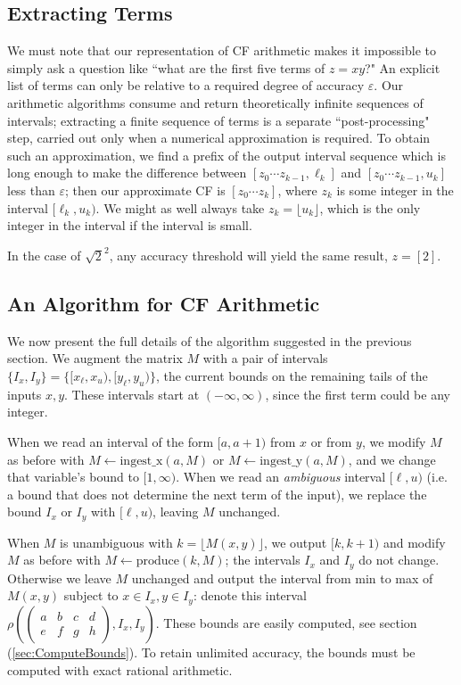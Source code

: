 \documentclass[11pt, oneside]{amsart}   	%
\newcommand{\abcd}{\left(
\begin{smallmatrix} 
a & b & c & d\\ 
e & f & g & h
\end{smallmatrix}
\right)}
\renewcommand{\:}{\negthickspace:\negthickspace}
\begin{document}
\subsection{Extracting Terms}
We must note that our representation of CF arithmetic makes it impossible to simply ask a question like ``what are the first
five terms of $z = xy$?" An explicit list of terms can only be relative to a required degree of accuracy $\varepsilon$. Our arithmetic
algorithms consume and return theoretically infinite sequences of intervals; extracting a finite sequence of terms is a separate
``post-processing" step, carried out only when a numerical approximation is required.
To obtain such an approximation, we find a prefix of
the output interval sequence which is long enough to make the difference between $[z_0 \cdots z_{k-1}, \ell_k]$ and $[z_0 \cdots
z_{k-1}, u_k]$ less than $\varepsilon$; then our approximate CF is $[z_0 \cdots z_k]$, where $z_k$ is some integer in the interval
$[\ell_k,u_k)$. We might as well always take $z_k = \lfloor u_k \rfloor$, which is the only integer in the interval if the interval is small. 

In the case of $\sqrt{2}^2$, any accuracy threshold will yield the same result, $z = [2]$.


\subsection{An Algorithm for CF Arithmetic}\label{sec:finalAlgorithm}
We now present the full details of the algorithm suggested in the previous section.  We augment the matrix $M$ with a pair of intervals
$\{I_x, I_y\} = \{[x_{\ell},x_{u}), [y_{\ell}, y_{u})\}$, the current bounds on the remaining tails of the inputs $x,y$. These
intervals start at $(-\infty, \infty)$, since the first term could be any integer.

When we read an interval of the form $[a,a+1)$ from
$x$ or from $y$, we modify $M$ as before with $M \leftarrow \mbox{ingest\_x}(a,M)$ or $M \leftarrow \mbox{ingest\_y}(a,M)$,
and we change that variable's bound to $[1, \infty)$. When we read an \emph{ambiguous} interval $[\ell, u)$ (i.e. a bound that
does not determine the next term of the input), we replace the bound $I_x$ or $I_y$  with $[\ell, u)$, leaving $M$ unchanged.

When $M$ is unambiguous with $k = \lfloor M(x,y) \rfloor$, we output $[k,k+1)$ and modify $M$ as before with $M \leftarrow \mbox{produce}(k,M)$;
the intervals $I_x$ and $I_y$ do not change. Otherwise we leave $M$ unchanged and output the interval from min to max of $M(x,y)$ subject to $x \in I_x, y \in I_y$:
denote this interval $\rho\left(\abcd, I_x, I_y\right)$.
These bounds are easily computed, see section (\ref{sec:ComputeBounds}).
To retain unlimited accuracy, the bounds must be computed with exact rational arithmetic.
\end{document}
